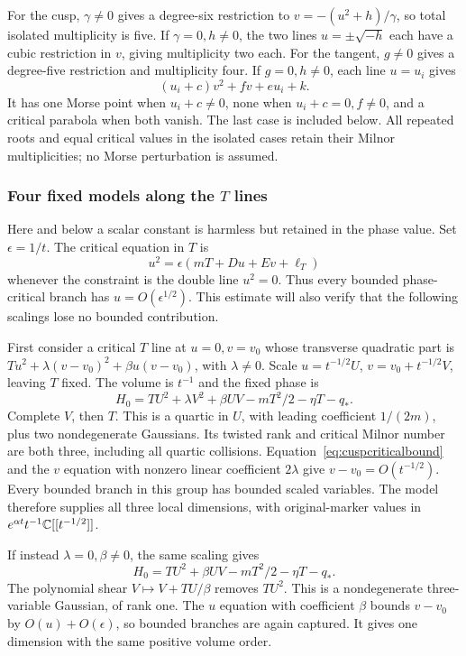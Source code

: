 For the cusp, $\gamma\ne0$ gives a degree-six restriction to
$v=-(u^2+h)/\gamma$, so total isolated multiplicity is five.
If $\gamma=0,h\ne0$, the two lines $u=\pm\sqrt{-h}$ each
have a cubic restriction in $v$, giving multiplicity two each.
For the tangent, $g\ne0$ gives a degree-five restriction and
multiplicity four. If $g=0,h\ne0$, each line $u=u_i$ gives
\[
 (u_i+c)v^2+fv+eu_i+k.
\]
It has one Morse point when $u_i+c\ne0$, none when
$u_i+c=0,f\ne0$, and a critical parabola when both vanish.
The last case is included below. All repeated roots and equal
critical values in the isolated cases retain their Milnor
multiplicities; no Morse perturbation is assumed.

\subsubsection*{Four fixed models along the $T$ lines}

Here and below a scalar constant is harmless but retained in the
phase value. Set $\epsilon=1/t$. The critical equation in $T$
is
\begin{equation}\label{eq:cuspcriticalbound}
 u^2=\epsilon(mT+Du+Ev+\ell_T)
\end{equation}
whenever the constraint is the double line $u^2=0$.
Thus every bounded phase-critical branch has $u=O(\epsilon^{1/2})$.
This estimate will also verify that the following scalings lose
no bounded contribution.

First consider a critical $T$ line at $u=0,v=v_0$ whose transverse
quadratic part is $Tu^2+\lambda(v-v_0)^2+\beta u(v-v_0)$,
with $\lambda\ne0$. Scale $u=t^{-1/2}U$,
$v=v_0+t^{-1/2}V$, leaving $T$ fixed. The volume is $t^{-1}$
and the fixed phase is
\[
 H_0=TU^2+\lambda V^2+\beta UV-mT^2/2-\eta T-q_*.
\]
Complete $V$, then $T$. This is a quartic in $U$, with leading
coefficient $1/(2m)$, plus two nondegenerate Gaussians. Its
twisted rank and critical Milnor number are both three, including
all quartic collisions. Equation~\eqref{eq:cuspcriticalbound}
and the $v$ equation with nonzero linear coefficient $2\lambda$
give $v-v_0=O(t^{-1/2})$. Every bounded branch in this group has
bounded scaled variables. The model therefore supplies all three
local dimensions, with original-marker values in
$e^{\alpha t}t^{-1}\mathbb C[[t^{-1/2}]]$.

If instead $\lambda=0,\beta\ne0$, the same scaling gives
\[
 H_0=TU^2+\beta UV-mT^2/2-\eta T-q_*.
\]
The polynomial shear $V\mapsto V+TU/\beta$ removes $TU^2$.
This is a nondegenerate three-variable Gaussian, of rank one.
The $u$ equation with coefficient $\beta$ bounds $v-v_0$ by
$O(u)+O(\epsilon)$, so bounded branches are again captured.
It gives one dimension with the same positive volume order.

